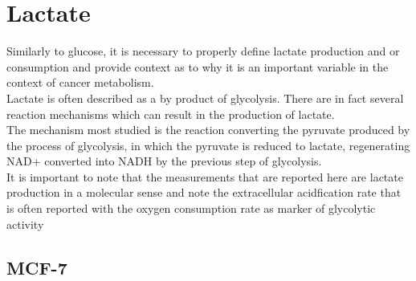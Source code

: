 \documentclass[11pt,a4paper]{article}
\begin{document}
% 


\section{Lactate}
Similarly to glucose, it is necessary to properly define lactate production and or consumption and provide context as to why it is an important  variable in the context of cancer metabolism.\\

Lactate is often described as a by product of glycolysis. There are in  fact several reaction mechanisms which can result in the production of lactate. \\

The mechanism most studied is the reaction converting the pyruvate produced  by the process of glycolysis, in which the pyruvate is reduced to lactate, regenerating NAD+ converted into NADH by the previous step of glycolysis.\cite{Berg2006}\\

It is important to note that the measurements that are reported here are lactate production in a molecular sense and note the extracellular acidfication rate that is often reported with the oxygen consumption rate as marker of glycolytic activity 

\subsection{MCF-7}
\end{document}
